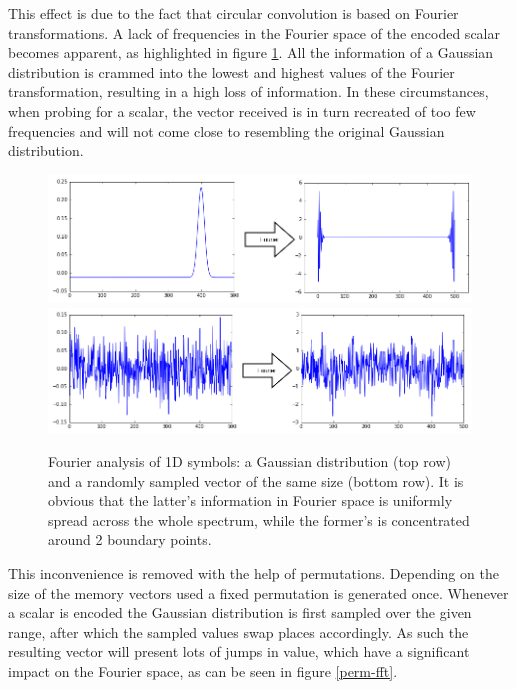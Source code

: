 \documentclass[conference]{IEEEtran}
\begin{document}
	This effect is due to the fact that circular convolution is based on Fourier transformations. A lack of frequencies in the Fourier space of the encoded scalar becomes apparent, as highlighted in figure \ref{fft}.
All the information of a Gaussian distribution is crammed into the lowest and highest values of the Fourier transformation, resulting in a high loss of information.
In these circumstances, when probing for a scalar, the vector received is in turn recreated of too few frequencies and will not come close to resembling the original Gaussian distribution.


\begin{figure}[th!]
	\includegraphics[width=\columnwidth]{img/scalar-pre-perm-fft.png}
	\includegraphics[width=\columnwidth]{img/scalar-random-fft.png}
	\caption{Fourier analysis of 1D symbols: a Gaussian distribution (top row) and a randomly sampled vector of the same size (bottom row). It is obvious that the latter's information in Fourier space is uniformly spread across the whole spectrum, while the former's is concentrated around 2 boundary points.}
	\label{fft}
\end{figure}
	
	This inconvenience is removed with the help of permutations.
Depending on the size of the memory vectors used a fixed permutation is generated once.
Whenever a scalar is encoded the Gaussian distribution is first sampled over the given range, after which the sampled values swap places accordingly.
As such the resulting vector will present lots of jumps in value, which have a significant impact on the Fourier space, as can be seen in figure \ref{perm-fft}.
	
\end{document}

